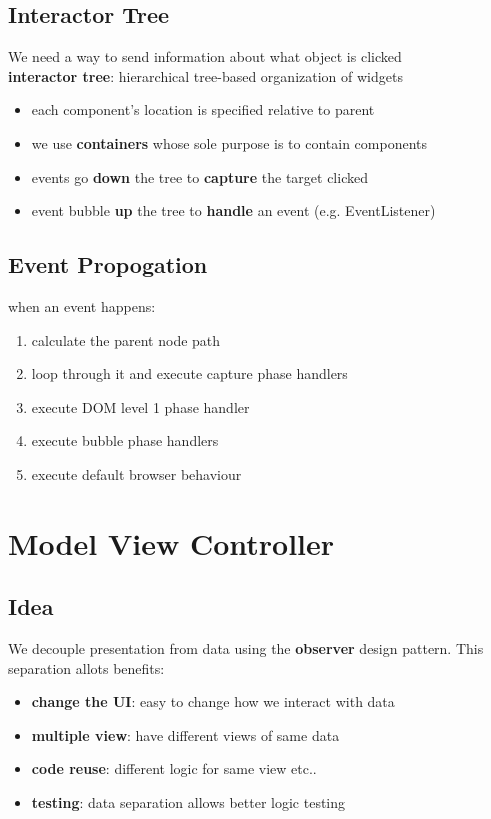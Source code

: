 \documentclass[]{article}
\theoremstyle{definition}
\begin{document}
		\subsection{Interactor Tree}			
			We need a way to send information about what object is clicked \\
			\textbf{interactor tree}: hierarchical tree-based organization of widgets
			\begin{itemize}
				\item each component's location is specified relative to parent
				\item we use \textbf{containers} whose sole purpose is to contain components
				\item events go \textbf{down} the tree to \textbf{capture} the target clicked
				\item event bubble \textbf{up} the tree to \textbf{handle} an event (e.g. EventListener)
			\end{itemize}
		\subsection{Event Propogation}
			when an event happens:
			\begin{enumerate}
				\item calculate the parent node path
				\item loop through it and execute capture phase handlers
				\item execute DOM level 1 phase handler
				\item execute bubble phase handlers 
				\item execute default browser behaviour
			\end{enumerate}
	\section{Model View Controller}
		\subsection{Idea}
			We decouple presentation from data using the \textbf{observer} design pattern. This separation allots benefits:
			\begin{itemize}
				\item \textbf{change the UI}: easy to change how we interact with data
				\item \textbf{multiple view}: have different views of same data
				\item \textbf{code reuse}: different logic for same view etc..
				\item \textbf{testing}: data separation allows better logic testing
			\end{itemize}
\end{document}

